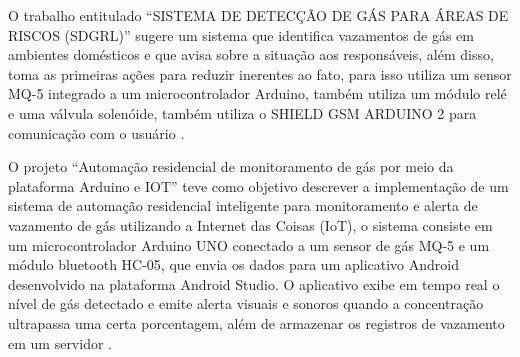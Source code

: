 O trabalho entitulado ``SISTEMA DE DETECÇÃO DE GÁS PARA ÁREAS DE RISCOS (SDGRL)'' sugere um  sistema que identifica vazamentos de gás em ambientes 
domésticos e que avisa sobre a situação aos responsáveis, além disso, toma as primeiras ações para reduzir inerentes ao fato, para isso utiliza um sensor 
MQ-5 integrado a um microcontrolador Arduino, também utiliza um módulo relé e uma válvula solenóide, também utiliza o SHIELD GSM ARDUINO 2 para comunicação com o usuário \cite{sistema-deteccao}. 

O projeto ``Automação residencial de monitoramento de gás por meio da plataforma Arduino e IOT'' teve como objetivo descrever a implementação de um sistema de automação residencial 
inteligente para monitoramento e alerta de vazamento de gás utilizando a Internet das Coisas (IoT), o sistema consiste em um microcontrolador Arduino UNO conectado a um sensor de gás MQ-5 e um 
módulo bluetooth HC-05, que envia os dados para um aplicativo Android desenvolvido na plataforma Android Studio. O aplicativo exibe em tempo real o nível de gás detectado e emite alerta visuais e 
sonoros quando a concentração ultrapassa uma certa porcentagem, além de armazenar os registros de vazamento em um servidor \cite{alexandre-automaccao-formulas-de-leitura-sensor}.